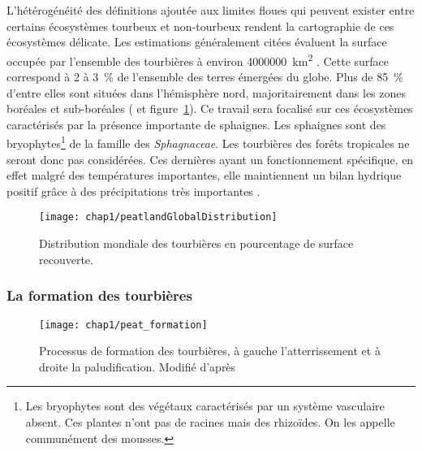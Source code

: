 L'hétérogénéité des définitions ajoutée aux limites floues qui peuvent exister entre certains écosystèmes tourbeux et non-tourbeux rendent la cartographie de ces écosystèmes délicate.
Les estimations généralement citées évaluent la surface occupée par l'ensemble des tourbières à environ \SI{4000000}{\square\kilo\meter} \citep{lappalainen1996}. 
Cette surface correspond à \num{2} à \SI{3}{\percent} de l'ensemble des terres émergées du globe.
Plus de \SI{85}{\percent} d'entre elles sont situées dans l'hémisphère nord, majoritairement dans les zones boréales et sub-boréales (\citealp{strack2008} et figure~\ref{fig:peatlandGlobalDistribution}).
Ce travail sera focalisé sur ces écosystèmes caractérisés par la présence importante de sphaignes.
Les sphaignes sont des bryophytes\footnote{Les bryophytes sont des végétaux caractérisés par un système vasculaire absent. Ces plantes n'ont pas de racines mais des rhizoïdes. On les appelle communément des mousses.} de la famille des \textit{Sphagnaceae}.
Les tourbières des forêts tropicales ne seront donc pas considérées.
Ces dernières ayant un fonctionnement spécifique, en effet malgré des températures importantes, elle maintiennent un bilan hydrique positif grâce à des précipitations très importantes \citep{chimner2005}.

\begin{figure}
\centering
\texttt{[image: chap1/peatlandGlobalDistribution]}
\caption{Distribution mondiale des tourbières en pourcentage de surface recouverte.}
\label{fig:peatlandGlobalDistribution} 
\end{figure}

\subsubsection{La formation des tourbières}

\begin{figure}
\centering
\texttt{[image: chap1/peat\_formation]}
\caption{Processus de formation des tourbières, à gauche l'atterrissement et à droite la paludification. Modifié d'après \citet{manneville1999}}
\label{fig:peat_formation}
\end{figure}

